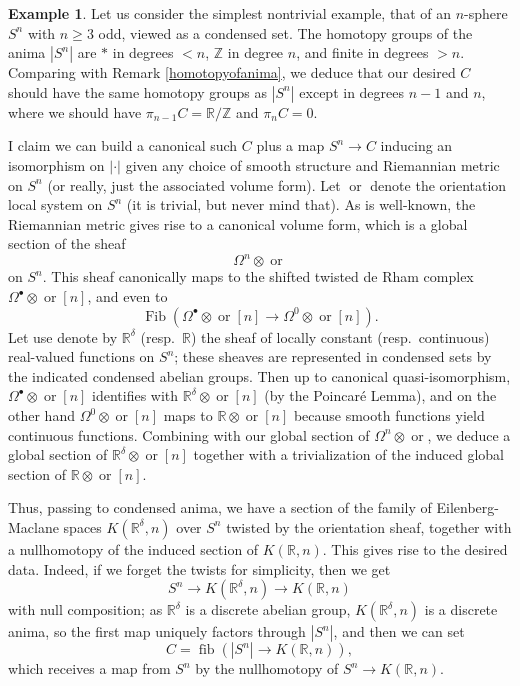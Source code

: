 \documentclass[12pt]{article}
\theoremstyle{definition}
\newtheorem{example}[theorem]{Example}
\newcommand{\on}{\operatorname}
\newcommand{\mbb}{\mathbb}
\begin{document}
\begin{example}\label{riemannian}
Let us consider the simplest nontrivial example, that of an $n$-sphere $S^n$ with $n\geq 3$ odd, viewed as a condensed set. The homotopy groups of the anima $
|S^n|$ are $\ast$ in degrees $<n$, $\mbb{Z}$ in degree $n$, and finite in degrees $>n$.  Comparing with Remark \ref{homotopyofanima}, we deduce that our desired $C$ should have the same homotopy groups as $|S^n|$ except in degrees $n-1$ and $n$, where we should have $\pi_{n-1}C = \mbb{R}/\mbb{Z}$ and $\pi_nC=0$.

I claim we can build a canonical such $C$ plus a map $S^n \to C$ inducing an isomorphism on $|\cdot|$ given any choice of smooth structure and Riemannian metric on $S^n$ (or really, just the associated volume form).  Let $\on{or}$ denote the orientation local system on $S^n$ (it is trivial, but never mind that).  As is well-known, the Riemannian metric gives rise to a canonical volume form, which is a global section of the sheaf
$$\Omega^n\otimes\on{or}$$
on $S^n$.  This sheaf canonically maps to the shifted twisted de Rham complex $\Omega^\bullet\otimes\on{or}[n]$, and even to
$$\on{Fib}(\Omega^\bullet\otimes\on{or}[n] \to \Omega^0\otimes\on{or}[n]).$$
Let use denote by $\mbb{R}^\delta$ (resp.\ $\mbb{R}$) the sheaf of locally constant (resp.\ continuous) real-valued functions on $S^n$; these sheaves are represented in condensed sets by the indicated condensed abelian groups.  Then up to canonical quasi-isomorphism, $\Omega^\bullet\otimes\on{or}[n]$ identifies with $\mbb{R}^\delta\otimes\on{or}[n]$ (by the Poincar\'{e} Lemma), and on the other hand $\Omega^0\otimes\on{or}[n]$ maps to $\mbb{R}\otimes\on{or}[n]$ because smooth functions yield continuous functions.     Combining with our global section of $\Omega^n\otimes \on{or}$, we deduce a global section of $\mbb{R}^\delta\otimes \on{or}[n]$ together with a trivialization of the induced global section of $\mbb{R}\otimes\on{or}[n]$.

Thus, passing to condensed anima, we have a section of the family of Eilenberg-Maclane spaces $K(\mbb{R}^\delta,n)$ over $S^n$ twisted by the orientation sheaf, together with a nullhomotopy of the induced section of $K(\mbb{R},n)$.  This gives rise to the desired data.  Indeed, if we forget the twists for simplicity, then we get
$$S^n \to K(\mbb{R}^\delta,n) \to K(\mbb{R},n)$$
with null composition; as $\mbb{R}^\delta$ is a discrete abelian group, $K(\mbb{R}^\delta,n)$ is a discrete anima, so the first map uniquely factors through $|S^n|$, and then we can set
$$C = \on{fib}(|S^n| \to K(\mbb{R},n)),$$
which receives a map from $S^n$ by the nullhomotopy of $S^n\to K(\mbb{R},n)$.


\end{example}
\end{document}
